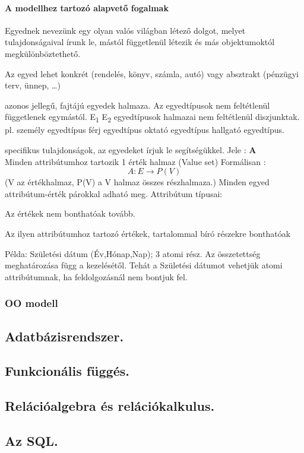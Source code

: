 \paragraph{A modellhez tartozó alapvető fogalmak}
\begin{description}[nosep]
	\item[egyed] Egyednek nevezünk egy olyan valós világban létező dolgot, melyet tulajdonságaival írunk le, mástól függetlenül létezik és más objektumoktól megkülönböztethető.
	\begin{note}
		Az egyed lehet konkrét (rendelés, könyv, számla, autó) vagy absztrakt (pénzügyi terv, ünnep, \dots)
	\end{note}

	\item[egyedtípus] azonos jellegű, fajtájú egyedek halmaza. Az egyedtípusok nem feltétlenül függetlenek egymástól. E\textsubscript{1} E\textsubscript{2} egyedtípusok halmazai nem feltétlenül diszjunktak. pl. személy egyedtípus férj egyedtípus oktató egyedtípus hallgató egyedtípus.

	\item[attribútumok] specifikus tulajdonságok, az egyedeket írjuk le segítségükkel. Jele : \textbf{A}\\
	Minden attribútumhoz tartozik 1 érték halmaz (Value set) Formálisan : $$A : E \to P(V)$$ (V az értékhalmaz, P(V) a V halmaz összes részhalmaza.) Minden egyed attribútum-érték párokkal adható meg.
	Attribútum típusai:
	\begin{description}[nosep]
		\item[egyszerű] Az értékek nem bonthatóak tovább.
		\item[összetett] Az ilyen attribútumhoz tartozó értékek, tartalommal bíró részekre bonthatóak
	\end{description}
	Példa: Születési dátum (Év,Hónap,Nap); 3 atomi rész. Az összetettség meghatározása függ a kezelésétől. Tehát a Születési dátumot vehetjük atomi attribútumnak, ha feldolgozásnál nem bontjuk fel.%
	
\end{description}

\subsubsection{OO modell}


\subsection{Adatbázisrendszer.}

\subsection{Funkcionális függés.}

\subsection{Relációalgebra és relációkalkulus. }

\subsection{Az SQL.}
